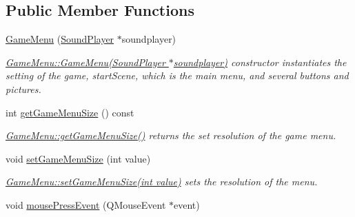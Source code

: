 \subsection*{Public Member Functions}
\begin{DoxyCompactItemize}
\item 
\hyperlink{class_game_menu_acc7215518fa676e7985aa3f34ca55ef7}{Game\+Menu} (\hyperlink{class_sound_player}{Sound\+Player} $\ast$soundplayer)
\begin{DoxyCompactList}\small\item\em \hyperlink{class_game_menu_acc7215518fa676e7985aa3f34ca55ef7}{Game\+Menu\+::\+Game\+Menu(\+Sound\+Player $\ast$soundplayer)} constructor instantiates the setting of the game, start\+Scene, which is the main menu, and several buttons and pictures. \end{DoxyCompactList}\item 
int \hyperlink{class_game_menu_adc24456c629b662425a461b7171da615}{get\+Game\+Menu\+Size} () const 
\begin{DoxyCompactList}\small\item\em \hyperlink{class_game_menu_adc24456c629b662425a461b7171da615}{Game\+Menu\+::get\+Game\+Menu\+Size()} returns the set resolution of the game menu. \end{DoxyCompactList}\item 
void \hyperlink{class_game_menu_aeb35fbd4176b7069dd59395b39d1950c}{set\+Game\+Menu\+Size} (int value)
\begin{DoxyCompactList}\small\item\em \hyperlink{class_game_menu_aeb35fbd4176b7069dd59395b39d1950c}{Game\+Menu\+::set\+Game\+Menu\+Size(int value)} sets the resolution of the menu. \end{DoxyCompactList}\item 
void \hyperlink{class_game_menu_ab043085d1280afd8f33c5e962a171373}{mouse\+Press\+Event} (Q\+Mouse\+Event $\ast$event)\hypertarget{class_game_menu_ab043085d1280afd8f33c5e962a171373}{}\label{class_game_menu_ab043085d1280afd8f33c5e962a171373}


\end{DoxyCompactItemize}
